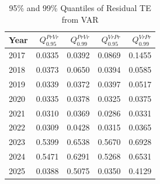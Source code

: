 \documentclass{elsarticle}
\def\rightarrow{}%
\begin{document}
\begin{table}[H]
  \caption{95\% and 99\% Quantiles of Residual TE from VAR}
  \label{tab:ter_residual_quantiles}
  \centering
  \begin{tabular}{lrrrr}
    \hline\noalign{\smallskip}
    \textbf{Year} & $Q_{0.95}^{Pr \rightarrow Vr}$ & $Q_{0.99}^{Pr \rightarrow Vr}$ & $Q_{0.95}^{Vr \rightarrow Pr}$ & $Q_{0.99}^{Vr \rightarrow Pr}$ \\
    \hline\noalign{\smallskip}
    2017 & 0.0335 & 0.0392 & 0.0869 & 0.1455 \\
    2018 & 0.0373 & 0.0650 & 0.0394 & 0.0585 \\
    2019 & 0.0339 & 0.0372 & 0.0397 & 0.0517 \\
    2020 & 0.0335 & 0.0378 & 0.0325 & 0.0375 \\
    2021 & 0.0310 & 0.0369 & 0.0286 & 0.0331 \\
    2022 & 0.0309 & 0.0428 & 0.0315 & 0.0365 \\
    2023 & 0.5399 & 0.6538 & 0.5670 & 0.6928 \\
    2024 & 0.5471 & 0.6291 & 0.5268 & 0.6531 \\
    2025 & 0.0388 & 0.5075 & 0.0350 & 0.4129 \\
    \hline
  \end{tabular}
\end{table}
\end{document}
